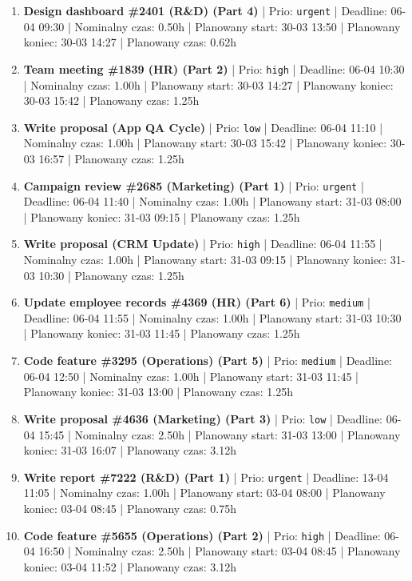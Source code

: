 {\begin{enumerate}
  \item [\textbf{14603}] \textbf{Design dashboard \#2401 (R\&D) (Part 4)} | Prio: \texttt{urgent} | Deadline: 06-04 09:30 | Nominalny czas: 0.50h | Planowany start: 30-03 13:50 | Planowany koniec: 30-03 14:27 | Planowany czas: 0.62h
  \item [\textbf{14610}] \textbf{Team meeting \#1839 (HR) (Part 2)} | Prio: \texttt{high} | Deadline: 06-04 10:30 | Nominalny czas: 1.00h | Planowany start: 30-03 14:27 | Planowany koniec: 30-03 15:42 | Planowany czas: 1.25h
  \item [\textbf{14695}] \textbf{Write proposal (App QA Cycle)} | Prio: \texttt{low} | Deadline: 06-04 11:10 | Nominalny czas: 1.00h | Planowany start: 30-03 15:42 | Planowany koniec: 30-03 16:57 | Planowany czas: 1.25h
  \item [\textbf{14607}] \textbf{Campaign review \#2685 (Marketing) (Part 1)} | Prio: \texttt{urgent} | Deadline: 06-04 11:40 | Nominalny czas: 1.00h | Planowany start: 31-03 08:00 | Planowany koniec: 31-03 09:15 | Planowany czas: 1.25h
  \item [\textbf{14629}] \textbf{Write proposal (CRM Update)} | Prio: \texttt{high} | Deadline: 06-04 11:55 | Nominalny czas: 1.00h | Planowany start: 31-03 09:15 | Planowany koniec: 31-03 10:30 | Planowany czas: 1.25h
  \item [\textbf{14658}] \textbf{Update employee records \#4369 (HR) (Part 6)} | Prio: \texttt{medium} | Deadline: 06-04 11:55 | Nominalny czas: 1.00h | Planowany start: 31-03 10:30 | Planowany koniec: 31-03 11:45 | Planowany czas: 1.25h
  \item [\textbf{14645}] \textbf{Code feature \#3295 (Operations) (Part 5)} | Prio: \texttt{medium} | Deadline: 06-04 12:50 | Nominalny czas: 1.00h | Planowany start: 31-03 11:45 | Planowany koniec: 31-03 13:00 | Planowany czas: 1.25h
  \item [\textbf{14684}] \textbf{Write proposal \#4636 (Marketing) (Part 3)} | Prio: \texttt{low} | Deadline: 06-04 15:45 | Nominalny czas: 2.50h | Planowany start: 31-03 13:00 | Planowany koniec: 31-03 16:07 | Planowany czas: 3.12h
  \item [\textbf{14601}] \textbf{Write report \#7222 (R\&D) (Part 1)} | Prio: \texttt{urgent} | Deadline: 13-04 11:05 | Nominalny czas: 1.00h | Planowany start: 03-04 08:00 | Planowany koniec: 03-04 08:45 | Planowany czas: 0.75h
  \item [\textbf{14626}] \textbf{Code feature \#5655 (Operations) (Part 2)} | Prio: \texttt{high} | Deadline: 06-04 16:50 | Nominalny czas: 2.50h | Planowany start: 03-04 08:45 | Planowany koniec: 03-04 11:52 | Planowany czas: 3.12h

\end{enumerate}}
